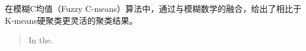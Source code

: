 \begin{cnabstract}
  在模糊C均值（Fuzzy C-means）算法中，通过与模糊数学的融合，给出了相比于K-means硬聚类更灵活的聚类结果。
\end{cnabstract}

\begin{abstract}
  In the.
  \par
\end{abstract} 